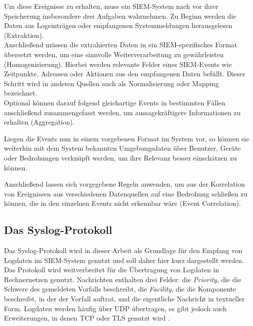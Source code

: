 Um diese Ereignisse zu erhalten, muss ein SIEM-System nach \cite{detken2014} vor ihrer Speicherung insbesondere drei Aufgaben wahrnehmen. Zu Beginn werden die Daten aus Logeinträgen oder empfangenen Systemmeldungen herausgelesen (Extraktion).\\
Anschließend müssen die extrahierten Daten in ein SIEM-spezifisches Format übersetzt werden, um eine sinnvolle Weiterverarbeitung zu gewährleisten (Homogenisierung). Hierbei werden relevante Felder eines SIEM-Events wie Zeitpunkte, Adressen oder Aktionen aus den empfangenen Daten befüllt. Dieser Schritt wird in anderen Quellen auch als Normalisierung oder Mapping bezeichnet.\\
Optional können darauf folgend gleichartige Events in bestimmten Fällen anschließend zusammengefasst werden, um aussagekräftigere Informationen zu erhalten (Aggregation).

Liegen die Events nun in einem vorgebenen Format im System vor, so können sie weiterhin mit dem System bekannten Umgebungsdaten über Benutzer, Geräte oder Bedrohungen verknüpft werden, um ihre Relevanz besser einschätzen zu können. 

Anschließend lassen sich vorgegebene Regeln anwenden, um aus der Korrelation von Ereignissen aus verschiedenen Datenquellen auf eine Bedrohung schließen zu können, die in den einzelnen Events nicht erkennbar wäre (Event Correlation).

\subsection*{Das Syslog-Protokoll}

\label{sec_basics_siem_syslog}

Das Syslog-Protokoll wird in dieser Arbeit als Grundlage für den Empfang von Logdaten im SIEM-System genutzt und soll daher hier kurz dargestellt werden. Das Protokoll wird weitverbreitet für die Übertragung von Logdaten in Rechnernetzen genutzt. Nachrichten enthalten drei Felder: die \textit{Priority}, die die Schwere des gemeldeten Vorfalls beschreibt, die \textit{Facility}, die die Komponente beschreibt, in der der Vorfall auftrat, und die eigentliche Nachricht in textueller Form. Logdaten werden häufig über UDP übertragen, es gibt jedoch auch Erweiterungen, in denen TCP oder TLS genutzt wird \cite{rfc5424}.
